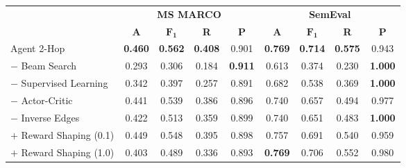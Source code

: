 \begin{center}
  \setlength{\tabcolsep}{2pt}
  \renewcommand{\arraystretch}{1.08}
  \footnotesize
  \begin{tabular}{lcccccccc} 
		\toprule
		& \multicolumn{4}{c}{\textbf{MS MARCO}} & \multicolumn{4}{c}{\textbf{SemEval}}  \\
		\cmidrule(lr{.6em}){2-5} \cmidrule(l{0.3em}){6-9}
		&\textbf{A} & \textbf{$\mathbf{F_1}$} & \textbf{R} & \textbf{P} & \textbf{A} & \textbf{$\mathbf{F_1}$} & \textbf{R} & \textbf{P}\\
		\midrule
		Agent 2-Hop & \textbf{0.460} & \textbf{0.562} & \textbf{0.408} & 0.901 & \textbf{0.769} & \textbf{0.714} & \textbf{0.575} & 0.943 \\ 
		\midrule
		$\mathbf{-}$ Beam Search & 0.293 & 0.306 &0.184 & \textbf{0.911} & 0.613 & 0.374 &0.230& \textbf{1.000} \\
		$\mathbf{-}$ Supervised Learning & 0.342 & 0.397 & 0.257 & 0.891 & 0.682 & 0.538 & 0.369 & \textbf{1.000} \\
		$\mathbf{-}$ Actor-Critic & 0.441 & 0.539 & 0.386 & 0.896 & 0.740 & 0.657 &0.494& 0.977 \\
		$\mathbf{-}$ Inverse Edges & 0.422 & 0.513 &0.359& 0.899 & 0.740 & 0.651 & 0.483 & \textbf{1.000} \\
		$\mathbf{+}$ Reward Shaping (0.1) & 0.449 & 0.548 & 0.395 & 0.898 & 0.757 & 0.691 & 0.540 & 0.959 \\
		$\mathbf{+}$ Reward Shaping (1.0) & 0.403 &0.489 & 0.336 & 0.893 & \textbf{0.769} & 0.706 & 0.552 & 0.980 \\
		\bottomrule
	\end{tabular}
\end{center}